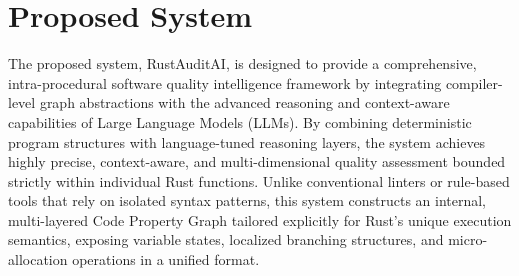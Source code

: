 \section{Proposed System}
\hspace{0.5cm}
The proposed system, RustAuditAI, is designed to provide a comprehensive, intra-procedural software quality intelligence framework by integrating compiler-level graph abstractions with the advanced reasoning and context-aware capabilities of Large Language Models (LLMs). By combining deterministic program structures with language-tuned reasoning layers, the system achieves highly precise, context-aware, and multi-dimensional quality assessment bounded strictly within individual Rust functions. Unlike conventional linters or rule-based tools that rely on isolated syntax patterns, this system constructs an internal, multi-layered Code Property Graph tailored explicitly for Rust’s unique execution semantics, exposing variable states, localized branching structures, and micro-allocation operations in a unified format.

